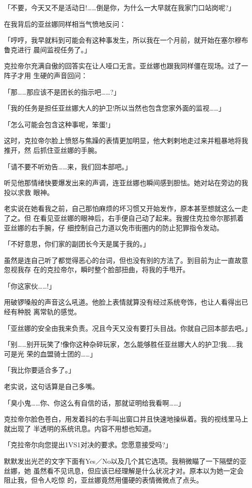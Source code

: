 \documentclass[11pt]{book}
\begin{document}
「不要，今天又不是活动日!……倒是你，为什么一大早就在我家门口站岗呢?」

在我背后的亚丝娜同样相当气愤地反问：

「哼哼，我早就料到可能会有这种事发生，所以我在一个月前，就开始在塞尔穆布鲁克进行
晨间监视任务了。」

克拉帝尔充满自傲的回答实在让人哑口无言。亚丝娜也跟我同样僵在现场。过了一阵子才用
生硬的声音回问：

「那……那应该不是团长的指示吧……?」

「我的任务是担任亚丝娜大人的护卫!所以当然也包含您家外面的监视……」

「怎么可能会包含这种事呢，笨蛋!」

这时，克拉帝尔脸上愤怒与焦躁的表情更加明显，他大剌剌地走过来并粗暴地将我推开，然
后抓住亚丝娜的手腕。

「请不要不听劝告……来，我们回本部吧。」

听见他那情绪快要爆发出来的声调，连亚丝娜也瞬间感到胆怯。她对站在旁边的我投以求救
眼神。

老实说在她看我之前，自己那怕麻烦的坏习惯又开始发作，原本甚至想就这么一走了之。但
在看见亚丝娜的眼神后，右手便自己动了起来。我握住克拉帝尔那抓着亚丝娜的右手腕，仔
细控制自己力道以免市街圈内的防止犯罪指令发动。

「不好意思，你们家的副团长今天是属于我的。」

虽然是连自己听了都觉得恶心的台词，但也没有别的方法了。到目前为止一直故意忽视我存
在的克拉帝尔，瞬时整个脸部扭曲，将我的手甩开。

「你这家伙……!」

用破锣嗓般的声音这么吼道。他脸上表情就算没有经过系统夸饰，也让人看得出已经有种脱
离常轨的感觉。

「亚丝娜的安全由我来负责。况且今天又没有要打头目战。你就自己回本部去吧。」

「别……别开玩笑了!像你这种杂碎玩家，怎么能够胜任亚丝娜大人的护卫!我……我可是光
荣的血盟骑士团的……」

「我比你要适合多了。」

老实说，这句话算是自己多嘴。

「臭小鬼……你、你这么有自信的话，那就证明给我看啊……」

克拉帝尔脸色苍白，用发着抖的右手叫出窗口并且快速地操纵着。我的视线里马上就出现了
半透明的系统讯息。内容不用想也知道。

「克拉帝尔向您提出1VS1对决的要求。您愿意接受吗?」

默默发出光芒的文字下面有Yes／No以及几个其它选项。我稍微瞄了一下隔壁的亚丝娜，她
虽然看不见讯息，但应该已经理解是什么状况才对。原本以为她一定会阻止我，但令人吃惊
的，亚丝娜竟然用僵硬的表情微微点了点头。
\end{document}
